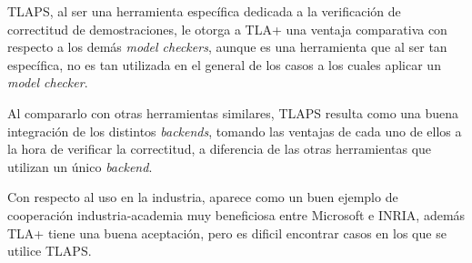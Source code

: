 \documentclass[spanish]{llncs}
\begin{document}
TLAPS, al ser una herramienta específica dedicada a la verificación de correctitud de demostraciones, le otorga a TLA+ una ventaja comparativa con respecto a los demás \textit{model checkers}, aunque es una herramienta que al ser tan específica, no es tan utilizada en el general de los casos a los cuales aplicar un \textit{model checker}.

Al compararlo con otras herramientas similares, TLAPS resulta como una buena integración de los distintos \textit{backends}, tomando las ventajas de cada uno de ellos a la hora de verificar la correctitud, a diferencia de las otras herramientas que utilizan un único \textit{backend}.

Con respecto al uso en la industria, aparece como un buen ejemplo de cooperación industria-academia muy beneficiosa entre Microsoft e INRIA, además TLA+ tiene una buena aceptación, pero es dificil encontrar casos en los que se utilice TLAPS.
\end{document}
